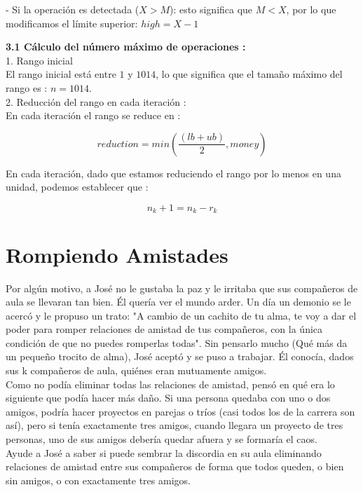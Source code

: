 \documentclass[
10pt, %
a4paper, %
oneside, %
headinclude,footinclude, %
BCOR5mm, %
]{scrartcl}
\begin{document}
- Si la operación es detectada ($X > M$): esto significa que $M < X$, por lo que modificamos el límite superior: $high = X -1$

\textbf{3.1 Cálculo del número máximo de operaciones :}\\

1. Rango inicial \\

El rango inicial está entre $1$ y $1014$, lo que significa que el tamaño máximo del rango es : $n = 1014$.\\

2. Reducción del rango en cada iteración : \\

En cada iteraci\'on el rango se reduce en :

$$
reduction = min(\frac{(lb+ub)}{2}, money)
$$

En cada iteración, dado que estamos reduciendo el rango por lo menos en una unidad, podemos establecer que :

$$
n_k+1 = n_k - r_k
$$



\section{Rompiendo Amistades}

Por algún motivo, a José no le gustaba la paz y le irritaba que sus compañeros de aula se llevaran tan bien. Él quería ver
el mundo arder. Un día un demonio se le acercó y le propuso un trato: "A cambio de un cachito de tu alma, te voy a dar el poder para
romper relaciones de amistad de tus compañeros, con la única condición de que no puedes romperlas todas". Sin pensarlo mucho (Qué más
da un pequeño trocito de alma), José aceptó y se puso a trabajar. Él conocía, dados sus k compañeros de aula, quiénes eran mutuamente
amigos.\\

Como no podía eliminar todas las relaciones de amistad, pensó en qué era lo siguiente que podía hacer más daño. Si una persona quedaba con
uno o dos amigos, podría hacer proyectos en parejas o tríos (casi todos los de la carrera son así), pero si tenía exactamente tres amigos,
cuando llegara un proyecto de tres personas, uno de sus amigos debería quedar afuera y se formaría el caos. \\

Ayude a José a saber si puede sembrar la discordia en su aula eliminando relaciones de amistad entre sus compañeros de forma que todos queden, o bien sin amigos, o con exactamente tres amigos.
\end{document}
